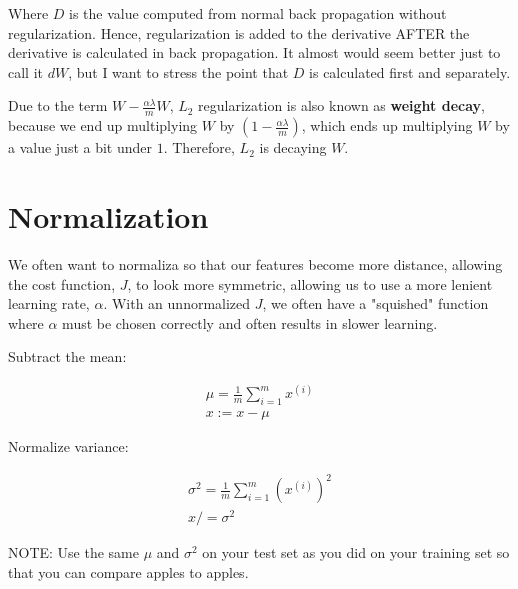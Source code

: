 \documentclass{article}
\begin{document}
Where $D$ is the value computed from normal back propagation without regularization.  Hence, regularization is added to the derivative AFTER the derivative is calculated in back propagation.  It almost would seem better just to call it $dW$, but I want to stress the point that $D$ is calculated first and separately.

Due to the term $W - \frac{\alpha\lambda}{m} W$, $L_2$ regularization is also known as \textbf{weight decay}, because we end up multiplying $W$ by $(1 - \frac{\alpha\lambda}{m})$, which ends up multiplying $W$ by a value just a bit under $1$.  Therefore, $L_2$ is decaying $W$.

\section{Normalization}

We often want to normaliza so that our features become more distance, allowing the cost function, $J$, to look more symmetric, allowing us to use a more lenient learning rate, $\alpha$.  With an unnormalized $J$, we often have a "squished" function where $\alpha$ must be chosen correctly and often results in slower learning.

Subtract the mean:

\begin{gather}
\mu = \frac{1}{m} \sum_{i=1}^{m} x^{(i)} \\
x := x - \mu
\end{gather}


Normalize variance:

\begin{gather}
\sigma^2 = \frac{1}{m} \sum_{i=1}^{m} (x^{(i)})^2 \\
x /= \sigma^2
\end{gather}

NOTE: Use the same $\mu$ and $\sigma^2$ on your test set as you did on your training set so that you can compare apples to apples.
\end{document}
